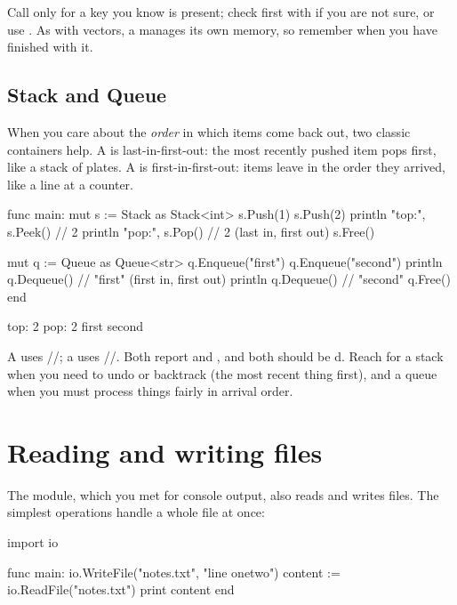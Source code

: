 \begin{warn}
Call  only for a key you know is present; check first with 
if you are not sure, or use . As with vectors, a  manages its own memory, so
remember  when you have finished with it.
\end{warn}

\subsection{Stack and Queue}

When you care about the \emph{order} in which items come back out, two classic
containers help. A  is last-in-first-out: the most recently pushed
item pops first, like a stack of plates. A  is first-in-first-out:
items leave in the order they arrived, like a line at a counter.

\begin{salamen}
func main:
    mut s := Stack {} as Stack<int>
    s.Push(1)
    s.Push(2)
    println "top:", s.Peek()        // 2
    println "pop:", s.Pop()         // 2 (last in, first out)
    s.Free()

    mut q := Queue {} as Queue<str>
    q.Enqueue("first")
    q.Enqueue("second")
    println q.Dequeue()             // "first" (first in, first out)
    println q.Dequeue()             // "second"
    q.Free()
end
\end{salamen}

\begin{progout}
top: 2
pop: 2
first
second
\end{progout}

A  uses //; a  uses
//. Both report  and
, and both should be d. Reach for a stack when you
need to undo or backtrack (the most recent thing first), and a queue when you must
process things fairly in arrival order.

\section{Reading and writing files}

The  module, which you met for console output, also reads and writes
files. The simplest operations handle a whole file at once:

\begin{salamen}
import io

func main:
    io.WriteFile("notes.txt", "line one\nline two\n")
    content := io.ReadFile("notes.txt")
    print content
end
\end{salamen}

